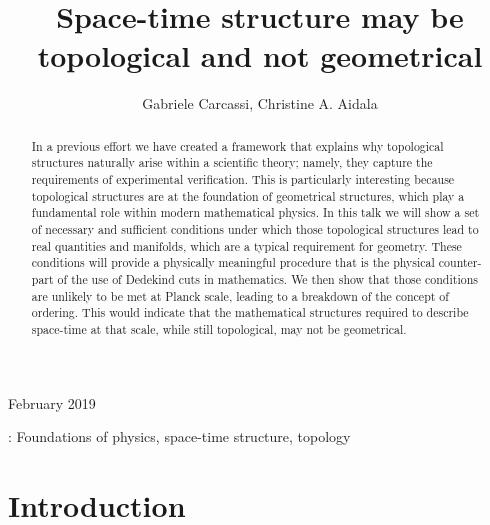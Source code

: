 \documentclass[12pt]{iopart}
\begin{document}
\title{Space-time structure may be topological and not geometrical}

\author{Gabriele Carcassi, Christine A. Aidala}

\address{Physics Department, University of Michigan, 450 Church Street\\
	Ann Arbor, MI 48109-1040,
	United States}
\vspace{10pt}
\begin{indented}
\item[]February 2019
\end{indented}

\begin{abstract}
In a previous effort we have created a framework that explains why topological structures naturally arise within a scientific theory; namely, they capture the requirements of experimental verification. This is particularly interesting because topological structures are at the foundation of geometrical structures, which play a fundamental role within modern mathematical physics. In this talk we will show a set of necessary and sufficient conditions under which those topological structures lead to real quantities and manifolds, which are a typical requirement for geometry. These conditions will provide a physically meaningful procedure that is the physical counter-part of the use of Dedekind cuts in mathematics. We then show that those conditions are unlikely to be met at Planck scale, leading to a breakdown of the concept of ordering. This would indicate that the mathematical structures required to describe space-time at that scale, while still topological, may not be geometrical.
\end{abstract}

%
: Foundations of physics, space-time structure, topology

%
\submitto{\PS}
%
% 
%



\section{Introduction}
\end{document}
